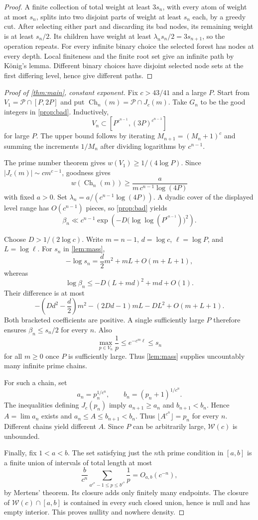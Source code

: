 \documentclass[11pt,a4paper]{article}
\theoremstyle{remark}
\newcommand{\PP}{\mathcal P}
\newcommand{\W}{\mathcal W}
\newcommand{\Ch}{\operatorname{Ch}}
\begin{document}
\begin{proof}
A finite collection of total weight at least $3s_n$, with every
atom of weight at most $s_n$, splits into two disjoint parts of
weight at least $s_n$ each, by a greedy cut.
After selecting either part and discarding its bad nodes, its
remaining weight is at least $s_n/2$.
Its children have weight at least
$\lambda_ns_n/2=3s_{n+1}$, so the operation repeats.
For every infinite binary choice the selected forest has nodes at
every depth. Local finiteness and the finite root set give an infinite
path by König's lemma.
Different binary choices have disjoint selected node sets at the
first differing level, hence give different paths.
\end{proof}

\begin{proof}[Proof of \cref{thm:main}, constant exponent]
Fix $c>43/41$ and a large $P$.
Start from $V_1=\PP\cap[P,2P]$ and put
$\Ch_n(m)=\PP\cap J_c(m)$.
Take $G_n$ to be the good integers in \cref{prop:bad}.
Inductively,
\[
             V_n\subset[P^{c^{n-1}},(3P)^{c^{n-1}}]
\]
for large $P$. The upper bound follows by iterating
$M_{n+1}=(M_n+1)^c$ and summing the increments $1/M_n$ after
dividing logarithms by $c^{n-1}$.

The prime number theorem gives
$w(V_1)\ge1/(4\log P)$.
Since $|J_c(m)|\sim cm^{c-1}$, goodness gives
\[
             w(\Ch_n(m))
      \ge\frac{a}{m\,c^{n-1}\log(4P)}
\]
with fixed $a>0$.
Set $\lambda_n=a/(c^{n-1}\log(4P))$.
A dyadic cover of the displayed level range has $O(c^{n-1})$
pieces, so \cref{prop:bad} yields
\[
 \beta_n\ll c^{n-1}
       \exp\left(-D\bigl(\log\log(P^{c^{n-1}})\bigr)^2\right).
\]

Choose $D>1/(2\log c)$.
Write $m=n-1$, $d=\log c$, $\ell=\log P$, and $L=\log\ell$.
For $s_n$ in \cref{lem:mass},
\[
 -\log s_n=\frac d2m^2+mL+O(m+L+1),
\]
whereas
\[
 \log\beta_n\le-D(L+md)^2+md+O(1).
\]
Their difference is at most
\[
 -\left(Dd^2-\frac d2\right)m^2
 -(2Dd-1)mL-DL^2+O(m+L+1).
\]
Both bracketed coefficients are positive. A single sufficiently
large $P$ therefore ensures $\beta_n\le s_n/2$ for every $n$.
Also
\[
       \max_{p\in V_n}\frac1p\le e^{-c^m\ell}\le s_n
\]
for all $m\ge0$ once $P$ is sufficiently large.
Thus \cref{lem:mass} supplies uncountably many infinite prime chains.

For such a chain, set
\[
       a_n=p_n^{1/c^n},\qquad b_n=(p_n+1)^{1/c^n}.
\]
The inequalities defining $J_c(p_n)$ imply
$a_{n+1}\ge a_n$ and $b_{n+1}<b_n$.
Hence $A=\lim a_n$ exists and
$a_n\le A\le b_{n+1}<b_n$.
Thus $\lfloor A^{c^n}\rfloor=p_n$ for every $n$.
Different chains yield different $A$.
Since $P$ can be arbitrarily large, $\W(c)$ is unbounded.

Finally, fix $1<a<b$. The set satisfying just the $n$th prime
condition in $[a,b]$ is a finite union of intervals of total length
at most
\[
       \frac b{c^n}
          \sum_{a^{c^n}-1\le p\le b^{c^n}}\frac1p=O_{a,b}(c^{-n}),
\]
by Mertens' theorem.
Its closure adds only finitely many endpoints.
The closure of $\W(c)\cap[a,b]$ is contained in every such closed
union, hence is null and has empty interior.
This proves nullity and nowhere density.
\end{proof}
\end{document}
